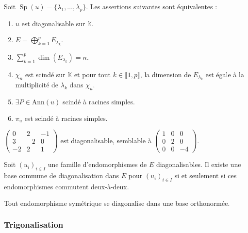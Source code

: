   \begin{theorem}
    Soit $\operatorname{Sp}(u) = \{ \lambda_1, \dots, \lambda_p \}$. Les assertions suivantes sont équivalentes :
    \begin{enumerate}[label=(\roman*)]
      \item $u$ est diagonalisable sur $\mathbb{K}$.
      \item $E = \bigoplus_{k=1}^p E_{\lambda_k}$.
      \item $\sum_{k=1}^p \dim(E_{\lambda_k}) = n$.
      \item $\chi_n$ est scindé sur $\mathbb{K}$ et pour tout $k \in \llbracket 1, p \rrbracket$, la dimension de $E_{\lambda_k}$ est égale à la multiplicité de $\lambda_k$ dans $\chi_u$.
      \item $\exists P \in \mathrm{Ann}(u)$ scindé à racines simples.
      \item $\pi_u$ est scindé à racines simples.
    \end{enumerate}
  \end{theorem}


  \begin{example}
    $\begin{pmatrix} 0 & 2 & -1 \\ 3 & -2 & 0 \\ -2 & 2 & 1 \end{pmatrix}$ est diagonalisable, semblable à $\begin{pmatrix} 1 & 0 & 0 \\ 0 & 2 & 0 \\ 0 & 0 & -4 \end{pmatrix}$.
  \end{example}


  \begin{theorem}
    Soit $(u_i)_{i \in I}$ une famille d'endomorphismes de $E$ diagonalisables. Il existe une base commune de diagonalisation dans $E$ pour $(u_i)_{i \in I}$ si et seulement si ces endomorphismes commutent deux-à-deux.
  \end{theorem}


  \begin{theorem}[Spectral]
    Tout endomorphisme symétrique se diagonalise dans une base orthonormée.
  \end{theorem}

  \subsubsection{Trigonalisation}

